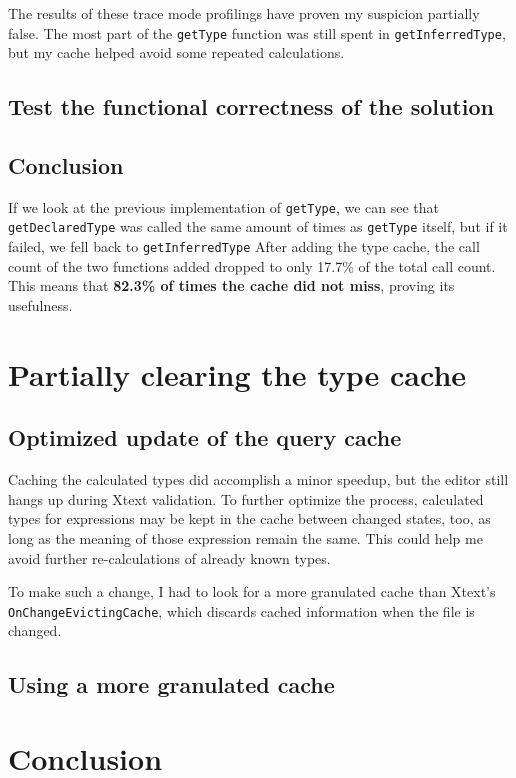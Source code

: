 \documentclass[11pt,a4paper,oneside]{report}
\begin{document}
The results of these trace mode profilings have proven my suspicion partially
false. The most part of the \texttt{getType} function was still spent in
\texttt{getInferredType}, but my cache helped avoid some repeated calculations.

\subsection{Test the functional correctness of the solution}

\subsection{Conclusion}
If we look at the previous implementation of \texttt{getType}, we can see that
\texttt{getDeclaredType} was called the same amount of times as
\texttt{getType} itself, but if it failed, we fell back to
\texttt{getInferredType} After adding the type cache, the call count of the two
functions added dropped to only 17.7\% of the total call count. This means that
\textbf{82.3\% of times the cache did not miss}, proving its usefulness.

\section{Partially clearing the type cache}
\subsection{Optimized update of the query cache}
Caching the calculated types did accomplish a minor speedup, but the editor
still hangs up during Xtext validation. To further optimize the process,
calculated types for expressions may be kept in the cache between changed
states, too, as long as the meaning of those expression remain the same. This
could help me avoid further re-calculations of already known types.

To make such a change, I had to look for a more granulated cache than Xtext's
\texttt{OnChangeEvictingCache}, which discards cached information when the file
is changed.

\subsection{Using a more granulated cache}

\section{Conclusion}
\end{document}
